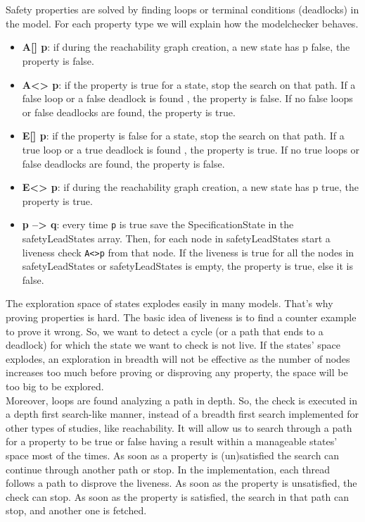 \documentclass[12pt]{article}
\begin{document}
\\\\
Safety properties are solved by finding loops or terminal conditions (deadlocks) in the model. For each property type we will explain how the modelchecker behaves.
\begin{itemize}
	\item \textbf{A[] p}: if during the reachability graph creation, a new state has p false, the property is false.
	\item \textbf{A<> p}: if the property is true for a state, stop the search on that path. If a false loop or a false deadlock is found , the property is false. If no false loops or false deadlocks are found, the property is true.
	\item \textbf{E[] p}:  if the property is false for a state, stop the search on that path. If a true loop or a true deadlock is found , the property is true. If no true loops or false deadlocks are found, the property is false.
	\item \textbf{E<> p}:  if during the reachability graph creation, a new state has p true, the property is true.
	\item \textbf{p --> q}: every time \texttt{p} is true save the SpecificationState in the safetyLeadStates array. Then, for each node in safetyLeadStates start a liveness check \texttt{A<>p} from that node. If the liveness is true for all the nodes in safetyLeadStates or safetyLeadStates is empty, the property is true, else it is false.
\end{itemize}
The exploration space of states explodes easily in many models. That's why proving properties is hard. The basic idea of liveness is to find a counter example to prove it wrong. So, we want to detect a cycle (or a path that ends to a deadlock) for which the state we want to check is not live. If the states' space explodes, an exploration in breadth will not be effective as the number of nodes increases too much before proving or disproving any property, the space will be too big to be explored.\\
Moreover, loops are found analyzing a path in depth. So, the check is executed in a depth first search-like manner, instead of a breadth first search implemented for other types of studies, like reachability. It will allow us to search through a path for a property to be true or false having a result within a manageable states' space most of the times. As soon as a property is (un)satisfied the search can continue through another path or stop. In the implementation, each thread follows a path to disprove the liveness. As soon as the property is unsatisfied, the check can stop. As soon as the property is satisfied, the search in that path can stop, and another one is fetched.\\
\end{document}
